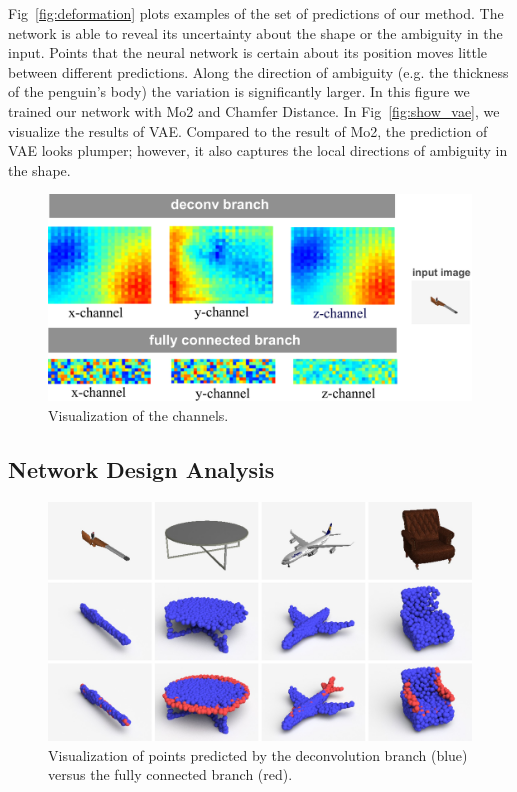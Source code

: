Fig~\ref{fig:deformation} plots examples of the set of predictions of our method. The network is able to reveal its uncertainty about the shape or the ambiguity in the input. Points that the neural network is certain about its position moves little between different predictions. Along the direction of ambiguity (e.g. the thickness of the penguin's body) the variation is significantly larger. In this figure we trained our network with Mo2 and Chamfer Distance. In Fig~\ref{fig:show_vae}, we visualize the results of VAE. Compared to the result of Mo2, the prediction of VAE looks plumper; however, it also captures the local directions of ambiguity in the shape.

\begin{figure}[h!]
  \centering
  \includegraphics[width=0.9\linewidth]{./fig/show_channels}
  \caption{Visualization of the channels.}\label{fig:vis_deconv_channels}
  \vspace{-1em}
\end{figure}
\subsection{Network Design Analysis}



\begin{figure}[!]
  \centering
  \includegraphics[width=0.9\linewidth]{./fig/two_branch}
  \caption{Visualization of points predicted by the deconvolution branch (blue) versus the fully connected branch (red).}\label{fig:vis_deconv_vs_fc}
  \vspace{-1em}
\end{figure}
\label{sec:exp:analysis}
